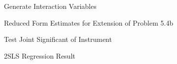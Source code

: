 Generate Interaction Variables
\begin{stlog}\end{stlog}
Reduced Form Estimates for Extension of Problem 5.4b
\begin{stlog}\end{stlog}
Test Joint Significant of Instrument
\begin{stlog}\end{stlog}
2SLS Regression Result
\begin{stlog}\end{stlog}
